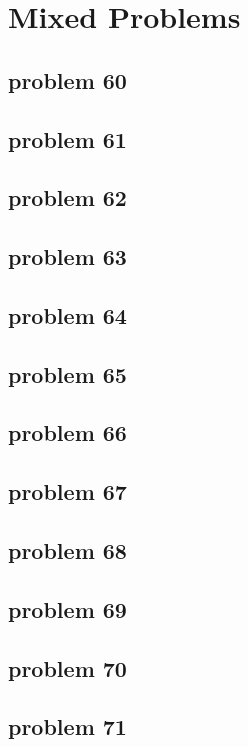 \section{Mixed Problems}

\subsection{problem 60}


\subsection{problem 61}


\subsection{problem 62}


\subsection{problem 63}


\subsection{problem 64}


\subsection{problem 65}


\subsection{problem 66}


\subsection{problem 67}


\subsection{problem 68}


\subsection{problem 69}


\subsection{problem 70}


\subsection{problem 71}

